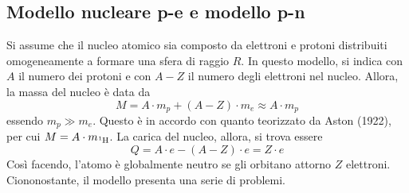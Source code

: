 \documentclass[11pt, a4paper]{scrartcl}
\theoremstyle{style}
\numberwithin{equation}{subsection}
\begin{document}
\subsection{Modello nucleare p-e e modello p-n}
Si assume che il nucleo atomico sia composto da elettroni e protoni distribuiti omogeneamente a formare una sfera di raggio $R$.
In questo modello, si indica con $A$ il numero dei protoni e con $A-Z$ il numero degli elettroni nel nucleo.
Allora, la massa del nucleo \`e data da 
\[
M = A\cdot m_p + (A-Z) \cdot m_e \approx A\cdot m_p
\] 
essendo $m_p \gg m_e$.
Questo \`e in accordo con quanto teorizzato da Aston (1922), per cui $M = A \cdot m_{\ce{^1H}}$.
La carica del nucleo, allora, si trova essere 
\[
Q = A\cdot e - (A-Z) \cdot e = Z\cdot e
\] 
Cos\`i facendo, l'atomo \`e globalmente neutro se gli orbitano attorno $Z$ elettroni.
Ciononostante, il modello presenta una serie di problemi.
\end{document}
